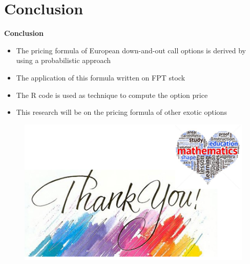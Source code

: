 \documentclass{beamer}
\begin{document}
\section{Conclusion}
\begin{frame}

{\color{red} \bfseries {Conclusion}}
\begin{itemize}
	\item The pricing formula of European down-and-out call options is derived by using a probabilistic approach\\[0.2cm]
	\item  The application of this formula written on FPT stock
	\item The R code is used as technique to compute the option price
	\item This research will be on the pricing formula of other exotic options
\end{itemize} 
\end{frame}
\begin{frame}
	\begin{figure}[htp]
		\begin{center}
			\includegraphics[scale=0.8]{fig11}
		\end{center}
	\end{figure}
\end{frame}
\end{document}
